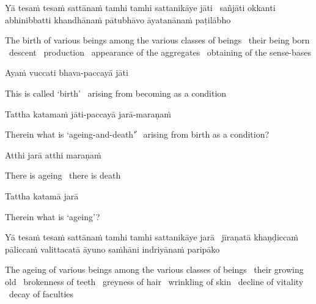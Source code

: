 \ifbfiveversion\clearpage\fi

\begin{pali-hang}
  Yā tesaṁ tesaṁ sattānaṁ tamhi tamhi sattanikāye jāti \breathmark\ sañjāti okkanti abhinibbatti khandhānaṁ pātubhāvo āyatanānaṁ paṭilābho\makeatletter\hyperlink{endnote83-appendix}\makeatother
\end{pali-hang}

\begin{english-hang-verses}
  The birth of various beings among the various classes of beings \breathmark\ their being born \breathmark\ descent \breathmark\ production \breathmark\ appearance of the aggregates \breathmark\ obtaining of the sense-bases
\end{english-hang-verses}

Ayaṁ vuccati bhava-paccayā jāti

\begin{english}
  This is called `birth' \breathmark\ arising from becoming as a condition
\end{english}

Tattha katamaṁ jāti-paccayā jarā-maraṇaṁ

\begin{english}
  Therein what is `ageing-and-death'̓ \breathmark\ arising from birth as a condition?
\end{english}

Atthi jarā atthi maraṇaṁ

\begin{english}
  There is ageing \breathmark\ there is death
\end{english}

Tattha katamā jarā

\begin{english}
  Therein what is `ageing'?
\end{english}

\begin{pali-hang}
  Yā tesaṁ tesaṁ sattānaṁ tamhi tamhi sattanikāye jarā \breathmark\ jīraṇatā khaṇḍiccaṁ pāliccaṁ valittacatā āyuno saṁhāni indriyānaṁ paripāko
\end{pali-hang}

\begin{english-hang-verses}
  The ageing of various beings among the various classes of beings \breathmark\ their growing old \breathmark\ brokenness of teeth \breathmark\ greyness of hair \breathmark\ wrinkling of skin \breathmark\ decline of vitality \breathmark\ decay of faculties
\end{english-hang-verses}

